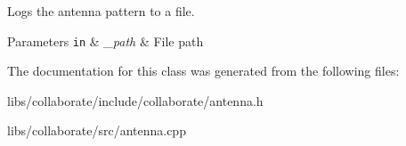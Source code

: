Logs the antenna pattern to a file. 


\begin{DoxyParams}[1]{Parameters}
\mbox{\tt in}  & {\em \+\_\+path} & File path \\
\hline
\end{DoxyParams}


The documentation for this class was generated from the following files\+:\begin{DoxyCompactItemize}
\item 
libs/collaborate/include/collaborate/antenna.\+h\item 
libs/collaborate/src/antenna.\+cpp\end{DoxyCompactItemize}
